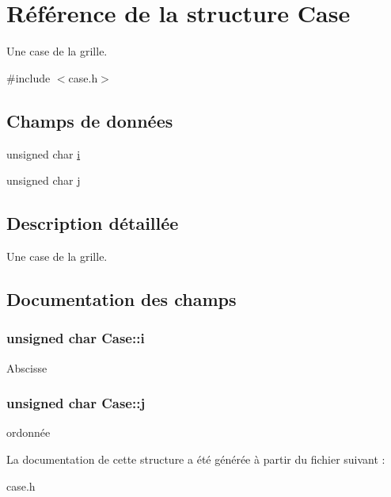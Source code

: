 \hypertarget{structCase}{\section{Référence de la structure Case}
\label{structCase}
}


Une case de la grille.  




{\ttfamily \#include $<$case.\-h$>$}

\subsection*{Champs de données}
\begin{DoxyCompactItemize}
\item 
unsigned char \hyperlink{structCase_aa153db46def2bd44f5e438a0f5695779}{i}
\item 
unsigned char \hyperlink{structCase_aa29567a6d5b6753ecf7cff4567a77e1e}{j}
\end{DoxyCompactItemize}


\subsection{Description détaillée}
Une case de la grille. 

\subsection{Documentation des champs}
\hypertarget{structCase_aa153db46def2bd44f5e438a0f5695779}{
\subsubsection[{i}]{\setlength{\rightskip}{0pt plus 5cm}unsigned char Case\-::i}}\label{structCase_aa153db46def2bd44f5e438a0f5695779}
Abscisse \hypertarget{structCase_aa29567a6d5b6753ecf7cff4567a77e1e}{
\subsubsection[{j}]{\setlength{\rightskip}{0pt plus 5cm}unsigned char Case\-::j}}\label{structCase_aa29567a6d5b6753ecf7cff4567a77e1e}
ordonnée 

La documentation de cette structure a été générée à partir du fichier suivant \-:\begin{DoxyCompactItemize}
\item 
case.\-h\end{DoxyCompactItemize}
